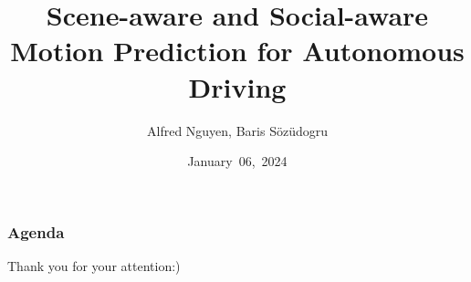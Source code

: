 \documentclass[shortpres,aspectratio=43]{beamer}
\title[Title]{Scene-aware and Social-aware Motion
Prediction for Autonomous Driving}
\author[Name]{Alfred Nguyen, Baris Sözüdogru}
\institute[TU M\"unchen]{Technical University of Munich}
\date{January~06,~2024}
\begin{document}


\begin{frame}[plain]
    \titlepage
\end{frame}

\begin{frame}
  \frametitle{Agenda}
  \tableofcontents
\end{frame}








\begin{frame}
  \begin{center}
  Thank you for your attention:)
  \end{center}
\end{frame}




\end{document}
